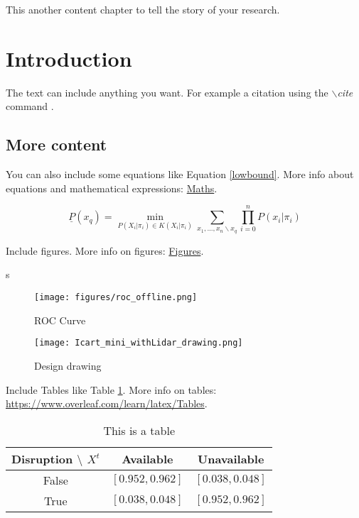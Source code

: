 This another content chapter to tell the story of your research. 

\section{Introduction} \label{sec:intro}
The text can include anything you want. For example a citation using the \textit{$\backslash$cite} command \cite{icart_mini}. 


\subsection{More content}\label{sec:content}
You can also include some equations like Equation \ref{lowbound}. More info about equations and mathematical expressions: 
\href{https://www.overleaf.com/learn/latex/Mathematical_expressions}{Maths}.

\begin{equation}
    \label{lowbound}
    \underline{P}(x_q) = \min_{P(X_i|\pi_i) \in K(X_i|\pi_i)} \sum_{x_1,...,x_n \backslash x_q} \prod_{i=0}^n P(x_i|\pi_i)
\end{equation}

Include figures. More info on figures: \href{https://www.overleaf.com/learn/latex/Inserting_Images}{Figures}.

s
\begin{figure}[ht]
  \centering
  \texttt{[image: figures/roc\_offline.png]}
  \caption{ROC Curve}
  \label{ROC Plot}
\end{figure} 

\begin{figure}[h]
    \centering
    \texttt{[image: Icart\_mini\_withLidar\_drawing.png]}
    \caption{Design drawing}
    \label{Fig1}
\end{figure}


Include Tables like Table \ref{tab:table}. More info on tables: 
\url{https://www.overleaf.com/learn/latex/Tables}.
\begin{table}[h]
    \centering
    \begin{tabular}{c|cc}
    \hline
    Disruption $\setminus$ $X^t$ & Available &  Unavailable \\ \hline \hline
    False      & $[0.952, 0.962]$ & $[0.038, 0.048]$ \\
    True       & $[0.038, 0.048]$ & $[0.952, 0.962]$ \\ \hline
    \end{tabular}
    \caption{This is a table} 
    \label{tab:table}
\end{table}



